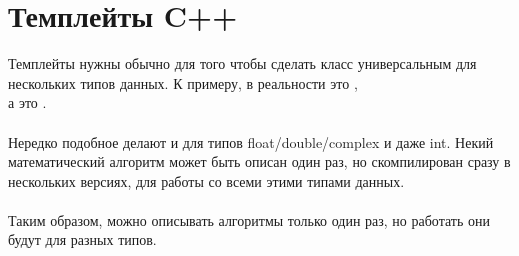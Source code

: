 \chapter{Темплейты C++}

Темплейты нужны обычно для того чтобы сделать класс универсальным для нескольких типов данных.
К примеру,  в реальности это , \\ 
а  это . \\
\\
Нередко подобное делают и для типов float/double/complex и даже int. 
Некий математический алгоритм может быть описан один раз,
но скомпилирован сразу в нескольких версиях, для работы со всеми этими типами данных. \\
\\
Таким образом, можно описывать алгоритмы только один раз, но работать они будут для разных типов.

